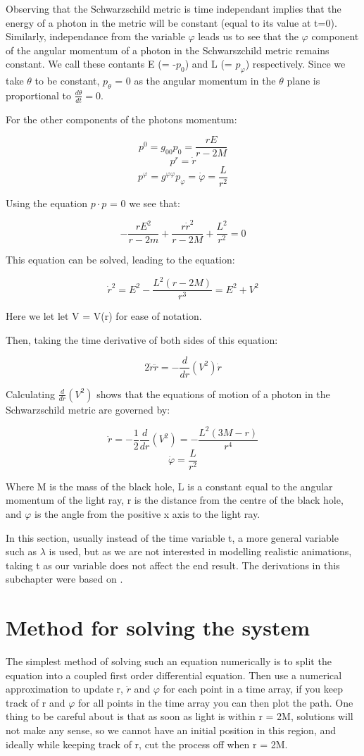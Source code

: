 \documentclass[oneside,openright,frontopenright]{dmathesis}
\begin{document}
	Observing that the Schwarzschild metric is time independant implies that the energy of a photon in the metric will be constant (equal to its value at t=0). Similarly, independance from the variable $\varphi$ leads us to see that the $\varphi$ component of the angular momentum of a photon in the Schwarszchild metric remains constant. We call these contants E (= -$p_0$) and L (= $p_\varphi$) respectively. Since we take ${\theta}$ to be constant, $p_\theta$ = 0 as the angular momentum in the $\theta$ plane is proportional to $\frac{d\theta}{dt} = 0$.

	For the other components of the photons momentum:

	\[p^0 = g_{00}p_0 = \frac{rE}{r-2M} \]
	\[p^r = \dot{r}\]
	\[p^\varphi = g^{\varphi\varphi}p_\varphi = \dot{\varphi} = \frac{L}{r^2}\]

	Using the equation $p \cdot p$ = 0 we see that:

	\[-\frac{rE^2}{r-2m}+\frac{r\dot{r}^2}{r-2M}+\frac{L^2}{r^2}=0\]

	This equation can be solved, leading to the equation:

	\[\dot{r}^2 = E^2-\frac{L^2(r-2M)}{r^3} = E^2 + V^2\]

	Here we let let V = V(r) for ease of notation.

	Then, taking the time derivative of both sides of this equation:

	\[2\dot{r}\ddot{r} = -\frac{d}{dr}(V^2)\dot{r}\]

	Calculating $\frac{d}{dr}(V^2)$ shows that the equations of motion of a photon in the Schwarzschild metric are governed by:

	\[\ddot{r} = -\frac{1}{2}\frac{d}{dr}(V^2) = -\frac{L^2(3M-r)}{r^4}\]
	\[\dot{\varphi}=\frac{L}{r^2}\]


	Where M is the mass of the black hole, L is a constant equal to the angular momentum of the light ray, r is the distance from the centre of the black hole, and $\varphi$ is the angle from the positive x axis to the light ray.

	In this section, usually instead of the time variable t, a more general variable such as $\lambda$ is used, but as we are not interested in modelling realistic animations, taking t as our variable does not affect the end result. The derivations in this subchapter were based on \cite{schutz2009first}.

\section{Method for solving the system}
	The simplest method of solving such an equation numerically is to split the equation into a coupled first order differential equation. Then use a numerical approximation to update r, $\dot{r}$ and $\varphi$ for each point in a time array, if you keep track of r and $\varphi$ for all points in the time array you can then plot the path. One thing to be careful about is that as soon as light is within r = 2M, solutions will not make any sense, so we cannot have an initial position in this region, and ideally while keeping track of r, cut the process off when r = 2M.
\end{document}
